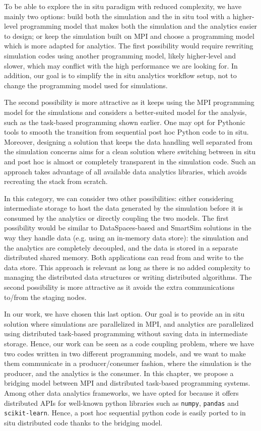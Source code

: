 To be able to explore the in situ paradigm with reduced complexity, we have mainly two options: build both the simulation and the in situ tool with a higher-level programming model that makes both the simulation and the analytics easier to design; or keep the simulation built on MPI and choose a programming model which is more adapted for analytics.
The first possibility would require rewriting simulation codes using another programming model, likely higher-level and slower, which may conflict with the high performance we are looking for. In addition, our goal is to simplify the in situ analytics workflow setup, not to change the programming model used for simulations.

The second possibility is more attractive as it keeps using the MPI programming model for the simulations and considers a better-suited model for the analysis, such as the task-based programming shown earlier. One may opt for Pythonic tools to smooth the transition from sequential post hoc Python code to in situ. Moreover, designing a solution that keeps the data handling well separated from the simulation concerns aims for a clean solution where switching between in situ and post hoc is almost or completely transparent in the simulation code. Such an approach takes advantage of all available data analytics libraries, which avoids recreating the stack from scratch.

In this category, we can consider two other possibilities: either considering intermediate storage to host the data generated by the simulation before it is consumed by the analytics or directly coupling the two models.  
The first possibility would be similar to DataSpaces-based and SmartSim solutions in the way they handle data (e.g. using an in-memory data store): the simulation and the analytics are completely decoupled, and the data is stored in a separate distributed shared memory. Both applications can read from and write to the data store. This approach is relevant as long as there is no added complexity to managing the distributed data structures or writing distributed algorithms. 
The second possibility is more attractive as it avoids the extra communications to/from the staging nodes. 

In our work, we have chosen this last option. 
Our goal is to provide an in situ solution where simulations are parallelized in MPI, and analytics are parallelized using distributed task-based programming without saving data in intermediate storage. Hence, our work can be seen as a code coupling problem, where we have two codes written in two different programming models, and we want to make them communicate in a producer/consumer fashion, where the simulation is the producer, and the analytics is the consumer.
In this chapter, we propose a bridging model between MPI and \dask distributed task-based programming systems. 
Among other data analytics frameworks, we have opted for \dask because it offers distributed APIs for well-known python libraries such as \texttt{numpy}, \texttt{pandas} and \texttt{scikit-learn}. Hence, a post hoc sequential python code is easily ported to in situ distributed \dask code thanks to the bridging model. 

